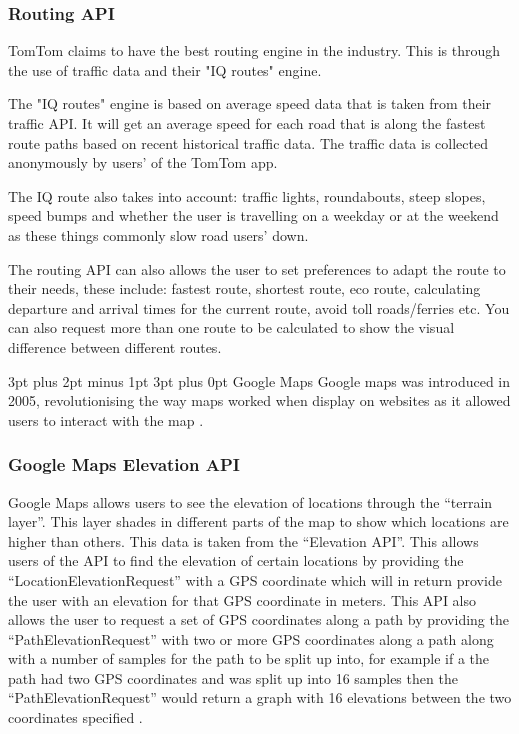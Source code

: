 \documentclass[12pt,a4paper]{article}
\makeatletter
\renewcommand\subsection{\@startsection {subsection}{1}{0mm} %
                               {3pt plus 2pt minus 1pt} %
                               {3pt plus 0pt} %
                               {\normalfont\bfseries}}
\makeatother
\begin{document}
\subsubsection{Routing API}

TomTom claims to have the best routing engine in the industry. This is through the use of traffic data and their "IQ routes" engine.

The "IQ routes" engine is based on average speed data that is taken from their traffic API. It will get an average speed for each road that is along the fastest route paths based on recent historical traffic data. The traffic data is collected anonymously by users' of the TomTom app. 

The IQ route also takes into account: traffic lights, roundabouts, steep slopes, speed bumps and whether the user is travelling on a weekday or at the weekend as these things commonly slow road users' down.

The routing API can also allows the user to set preferences to adapt the route to their needs, these include: fastest route, shortest route, eco route, calculating departure and arrival times for the current route, avoid toll roads/ferries etc. You can also request more than one route to be calculated to show the visual difference between different routes.

\subsection{Google Maps}
Google maps was introduced in 2005, revolutionising the way maps worked when display on websites as it allowed users to interact with the map \cite{Svennerberg2010}.

\subsubsection{Google Maps Elevation API}
Google Maps allows users to see the elevation of locations through the ``terrain layer''. This layer shades in different parts of the map to show which locations are higher than others. This data is taken from the ``Elevation API''. This allows users of the API to find the elevation of certain locations by providing the ``LocationElevationRequest'' with a GPS coordinate which will in return provide the user with an elevation for that GPS coordinate in meters. This API also allows the user to request a set of GPS coordinates along a path by providing the ``PathElevationRequest'' with two or more GPS coordinates along a path along with a number of samples for the path to be split up into, for example if a the path had two GPS coordinates and was split up into 16 samples then the ``PathElevationRequest'' would return a graph with 16 elevations between the two coordinates specified \cite{googleElevation}.
\end{document}
